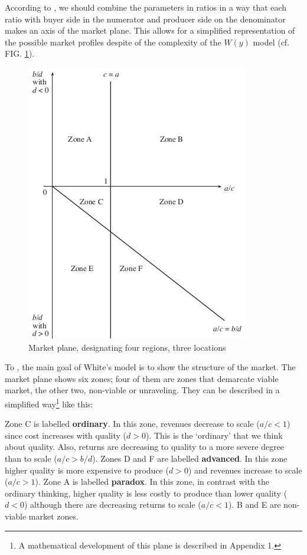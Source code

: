 \documentclass[a4paper, 12pt, openright, oneside, german, french, brazil, english]{abntex2}
\begin{document}
	
	According to , we should combine the parameters in ratios in a way that each ratio with buyer side in the numerator and producer side on the denominator makes an axis of the market plane. This allows for a simplified representation of the possible market profiles despite of the complexity of the $W(y)$ model (cf. FIG. \ref{market-plane}).
	
	
	\begin{figure}[th]
		\centering
		\caption{Market plane, designating four regions, three locations}
		\label{market-plane}
		\includegraphics[scale=1]{market_plane_favereau.png}
	\end{figure}

	To , the main goal of White's model is to show the structure of the market. The market plane shows six zones; four of them are zones that demarcate viable market, the other two, non-viable or unraveling. They can be described in a simplified way\footnote{A mathematical development of this plane is described in Appendix 1.} like this:
	
	Zone C is labelled \textbf{ordinary}. In this zone, revenues decrease to scale ($a/c < 1$) since cost increases with quality ($d > 0$). This is the `ordinary' that we think about quality. Also, returns are decreasing to quality to a more severe degree than to scale ($a/c > b/d$). Zones D and F are labelled \textbf{advanced}. In this zone higher quality is more expensive to produce ($d > 0$) and revenues increase to scale ($a/c > 1$). Zone A is labelled \textbf{paradox}. In this zone, in contrast with the ordinary thinking, higher quality is less costly to produce than lower quality ($d < 0$) although there are decreasing returns to scale ($a/c < 1$). B and E are non-viable market zones. 
	
\end{document}

